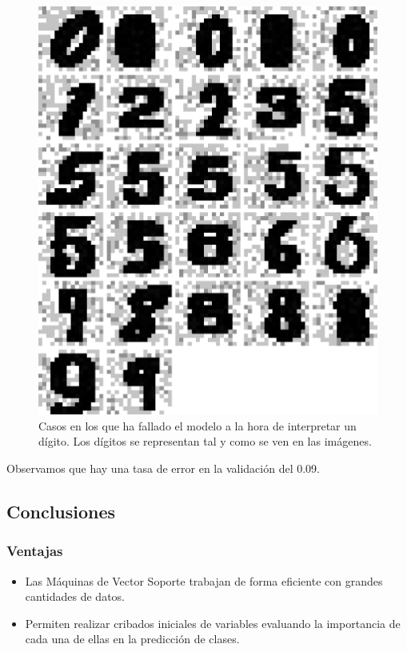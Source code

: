 \documentclass[12pt,spanish,a4paper]{article}
\numberwithin{equation}{section}
\begin{document}
\begin{figure}[h]

{\centering \includegraphics[width=0.8\linewidth]{graphics/svm/digitos_fallados_modelo_svm_linear2_paso2_b-1} 

}

\caption{Casos en los que ha fallado el modelo a la hora de interpretar un dígito. Los dígitos se representan tal y como se ven en las imágenes.}\label{fig:digitos_fallados_modelo_svm_linear2_paso2_b}
\end{figure}

Observamos que hay una tasa de error en la validación del 0.09.

\clearpage

\subsection{Conclusiones}\label{conclusiones}

\subsubsection{Ventajas}\label{ventajas}

\begin{itemize}
\item
  Las Máquinas de Vector Soporte trabajan de forma eficiente con grandes
  cantidades de datos.
\item
  Permiten realizar cribados iniciales de variables evaluando la
  importancia de cada una de ellas en la predicción de clases.
\end{itemize}
\end{document}
